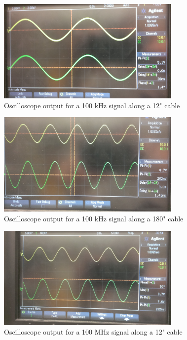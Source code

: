 \documentclass{article}
\begin{document}
\begin{figure}[H]
    \centering
    \includegraphics[width=0.8\textwidth]{./Images/RoleWave1.jpg}
    \caption{Oscilloscope output for a 100 kHz signal along a 12" cable}
\end{figure}
\begin{figure}[H]
    \centering
    \includegraphics[width=0.8\textwidth]{./Images/RoleWave2.jpg}
    \caption{Oscilloscope output for a 100 kHz signal along a 180" cable}
\end{figure}
\begin{figure}[H]
    \centering
    \includegraphics[width=0.8\textwidth]{./Images/RoleWave3.jpg}
    \caption{Oscilloscope output for a 100 MHz signal along a 12" cable}
\end{figure}
\end{document}
